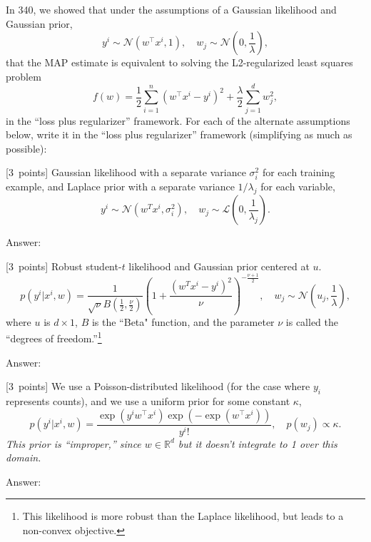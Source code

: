 \documentclass{article}
\newcommand{\ask}[1]{\textcolor{question}{#1}}
\newenvironment{answer}{\par\begingroup\color{answer}Answer: }{\endgroup}
\newcommand{\pts}[1]{\textcolor{points}{[#1~points]}}
\newcommand{\meta}[1]{\textcolor{black!60!white}{\emph{#1}}}
\newcommand{\TODO}{\color{red}{TODO}}
\def\R{\mathbb{R}}
\begin{document}
In 340, we showed that under the assumptions of a Gaussian likelihood and Gaussian prior,
\[
y^i \sim \mathcal{N}(w^\top x^i,1), \quad w_j \sim \mathcal{N}\left(0,\frac{1}{\lambda}\right),
\]
that the MAP estimate is equivalent to solving the L2-regularized least squares problem
\[
f(w) = \frac{1}{2}\sum_{i=1}^n (w^\top x^i - y^i)^2 + \frac \lambda 2 \sum_{j=1}^d w_j^2,
\]
in the ``loss plus regularizer'' framework.
For each of the alternate assumptions below, \ask{write it in the ``loss plus regularizer'' framework (simplifying as much as possible)}:

\begin{qlist}
\item \pts{3} Gaussian likelihood with a separate variance $\sigma_i^2$ for each training example, and Laplace prior with a separate variance $1/\lambda_j$ for each variable,
\[ y^i \sim \mathcal{N}(w^Tx^i,\sigma_i^2), \quad w_j \sim \mathcal{L}\left(0,\frac{1}{\lambda_j}\right). \]

\begin{answer}\TODO\end{answer}

\item \pts{3} Robust student-$t$ likelihood and Gaussian prior centered at $u$.
\[
p(y^i | x^i, w) = \frac{1}{\sqrt{\nu}B\left(\frac 1 2,\frac \nu 2\right)}\left(1 + \frac{(w^Tx^i - y^i)^2}{\nu}\right)^{-\frac{\nu + 1}{2}}, \quad w_j \sim \mathcal{N}\left(u_j,\frac{1}{\lambda}\right),
\]
where $u$ is $d \times 1$, $B$ is the ``Beta" function, and the parameter $\nu$ is called the ``degrees of freedom.''\footnote{This likelihood is more robust than the Laplace likelihood, but leads to a non-convex objective.}

\begin{answer}\TODO\end{answer}

\item \pts{3} We use a Poisson-distributed likelihood (for the case where $y_i$ represents counts), and we use a uniform prior for some constant $\kappa$,
\[
p(y^i | x^i, w) = \frac{\exp(y^iw^\top x^i)\exp(-\exp(w^\top x^i))}{y^i!}, \quad p(w_j) \propto \kappa.
\]
\meta{This prior is ``improper,'' since $w\in\R^d$ but it doesn't integrate to 1 over this domain.}
\begin{answer}\TODO\end{answer}

\end{qlist}
\end{document}
